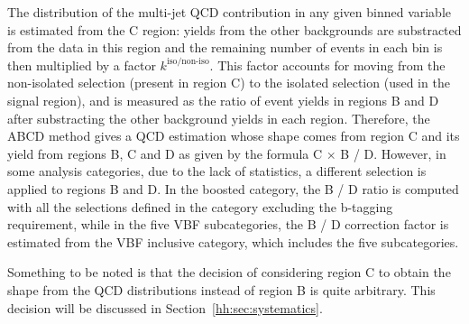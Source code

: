 \documentclass[../main.tex]{subfiles}
\begin{document}
The distribution of the multi-jet QCD contribution in any given binned variable is estimated from the C region: yields from the other backgrounds are substracted from the data in this region and the remaining number of events in each bin is then multiplied by a factor $k^{\text{iso/non-iso}}$. This factor accounts for moving from the non-isolated selection (present in region C) to the isolated selection (used in the signal region), and is measured as the ratio of event yields in regions B and D after substracting the other background yields in each region. Therefore, the ABCD method gives a QCD estimation whose shape comes from region C and its yield from regions B, C and D as given by the formula C $\times$ B / D. However, in some analysis categories, due to the lack of statistics, a different selection is applied to regions B and D. In the boosted category, the B / D ratio is computed with all the selections defined in the category excluding the b-tagging requirement, while in the five VBF subcategories, the B / D correction factor is estimated from the VBF inclusive category, which includes the five subcategories.

Something to be noted is that the decision of considering region C to obtain the shape from the QCD distributions instead of region B is quite arbitrary. This decision will be discussed in Section~\ref{hh:sec:systematics}.






%
%
\end{document}
